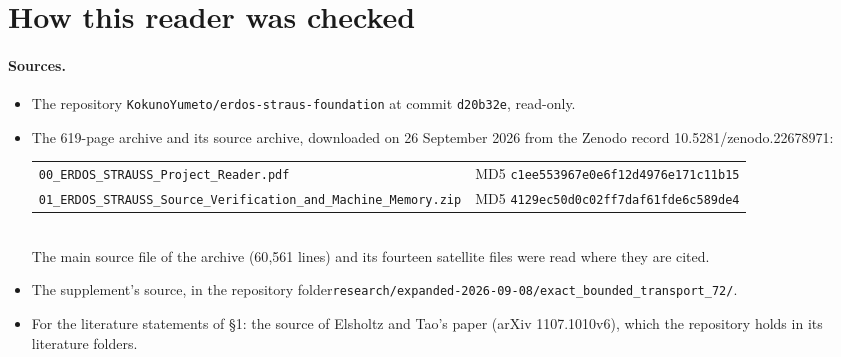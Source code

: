 \section{How this reader was checked}\label{app:verification}

\paragraph{Sources.}
\begin{itemize}
\item The repository \texttt{KokunoYumeto/erdos-straus-foundation} at commit \texttt{d20b32e}, read-only.
\item The 619-page archive and its source archive, downloaded on 26 September 2026 from the Zenodo record 10.5281/zenodo.22678971:\\[2pt]
{\footnotesize\begin{tabular}{@{}ll@{}}
\texttt{00\_ERDOS\_STRAUSS\_Project\_Reader.pdf} & MD5 \texttt{c1ee553967e0e6f12d4976e171c11b15}\\
\texttt{01\_ERDOS\_STRAUSS\_Source\_Verification\_and\_Machine\_Memory.zip} & MD5 \texttt{4129ec50d0c02ff7daf61fde6c589de4}
\end{tabular}}\\[2pt]
The main source file of the archive (60{,}561 lines) and its fourteen satellite files were read where they are cited.
\item The supplement's source, in the repository folder\newline \texttt{research/expanded-2026-09-08/exact\_bounded\_transport\_72/}.
\item For the literature statements of §1: the source of Elsholtz and Tao's paper (arXiv 1107.1010v6), which the repository holds in its literature folders.
\end{itemize}

